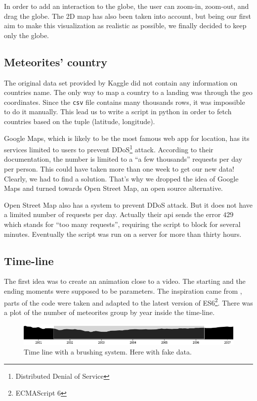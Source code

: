 \documentclass[10pt,conference,compsocconf]{IEEEtran}
\begin{document}
In order to add an interaction to the globe, the user can zoom-in, zoom-out, and drag the globe. 
The 2D map has also been taken into account, but being our first aim to make this visualization as realistic as possible, we finally decided to keep only the globe.

\subsection{Meteorites' country}

The original data set provided by Kaggle did not contain any information on countries name. The only way to map a country to a landing was through the geo coordinates. Since the \texttt{csv} file contains many thousands rows, it was impossible to do it manually. This lead us to write a script in python in order to fetch countries based on the tuple (latitude, longitude).

Google Maps, which is likely to be the most famous web app for location, has its services limited to users to prevent DDoS\footnote{Distributed Denial of Service} attack. According to their documentation, the number is limited to a ``a few thousands'' requests per day per person. This could have taken more than one week to get our new data! Clearly, we had to find a solution. That's why we dropped the idea of Google Maps and turned towards Open Street Map, an open source alternative.

Open Street Map also has a system to prevent DDoS attack. But it does not have a limited number of requests per day. Actually their api sends the error $429$ which stands for ``too many requests'', requiring the script to block for several minutes. Eventually the script was run on a server for more than thirty hours.

\subsection{Time-line}

The first idea was to create an animation close to a video. The starting and the ending moments were supposed to be parameters. The inspiration came from \cite{ocks_brush_and_zoom}, parts of the code were taken and adapted to the latest version of ES6\footnote{ECMAScript 6}. There was a plot of the number of meteorites group by year inside the time-line.

\begin{figure}[H]
  \centering
  \includegraphics[width=\columnwidth]{images/timeline_brush.png}
  \vspace{-3mm}
  \caption{Time line with a brushing system. Here with fake data.}
  \label{fig:timeline_brush}
\end{figure}
\end{document}
